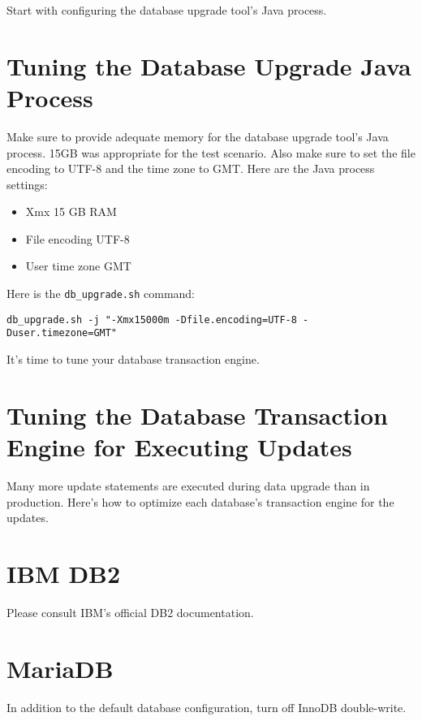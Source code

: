 Start with configuring the database upgrade tool's Java process.

\section{Tuning the Database Upgrade Java
Process}\label{tuning-the-database-upgrade-java-process}

Make sure to provide adequate memory for the database upgrade tool's
Java process. 15GB was appropriate for the test scenario. Also make sure
to set the file encoding to UTF-8 and the time zone to GMT. Here are the
Java process settings:

\begin{itemize}
\tightlist
\item
  Xmx 15 GB RAM
\item
  File encoding UTF-8
\item
  User time zone GMT
\end{itemize}

Here is the \texttt{db\_upgrade.sh} command:

\begin{verbatim}
db_upgrade.sh -j "-Xmx15000m -Dfile.encoding=UTF-8 -Duser.timezone=GMT"
\end{verbatim}

It's time to tune your database transaction engine.

\section{Tuning the Database Transaction Engine for Executing
Updates}\label{tuning-the-database-transaction-engine-for-executing-updates}

Many more update statements are executed during data upgrade than in
production. Here's how to optimize each database's transaction engine
for the updates.

\section{IBM DB2}\label{ibm-db2}

Please consult IBM's official DB2 documentation.

\section{MariaDB}\label{mariadb}

In addition to the default database configuration, turn off InnoDB
double-write.

